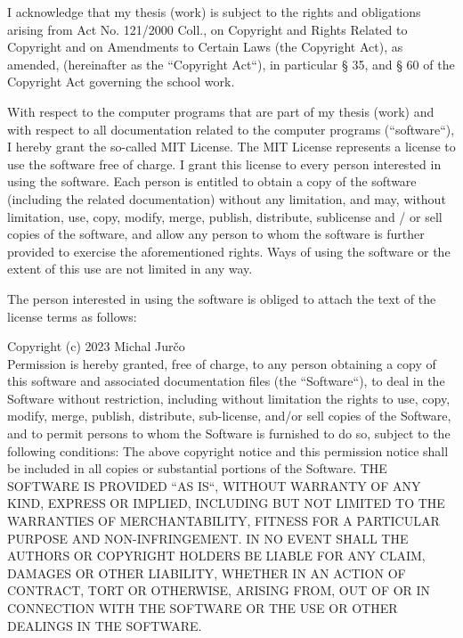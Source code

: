 \medskip\noindent
I acknowledge that my thesis (work) is subject to the rights and obligations
arising from Act No. 121/2000 Coll., on Copyright and Rights Related to
Copyright and on Amendments to Certain Laws (the Copyright Act), as
amended, (hereinafter as the “Copyright Act“), in particular § 35, and § 60 of
the Copyright Act governing the school work.

\medskip\noindent
With respect to the computer programs that are part of my thesis (work) and
with respect to all documentation related to the computer programs (“software“),
I hereby grant the so-called MIT License. The MIT License represents a license
to use the software free of charge. I grant this license to every person interested
in using the software. Each person is entitled to obtain a copy of the software
(including the related documentation) without any limitation, and may, without
limitation, use, copy, modify, merge, publish, distribute, sublicense and / or sell
copies of the software, and allow any person to whom the software is further
provided to exercise the aforementioned rights. Ways of using the software or
the extent of this use are not limited in any way.

\medskip\noindent
The person interested in using the software is obliged to attach the text of
the license terms as follows:

\medskip\noindent
Copyright (c) 2023 Michal Jurčo\\
Permission is hereby granted, free of charge, to any person obtaining a copy of
this software and associated documentation files (the “Software“), to deal in
the Software without restriction, including without limitation the rights to use,
copy, modify, merge, publish, distribute, sub-license, and/or sell copies of the
Software, and to permit persons to whom the Software is furnished to do so,
subject to the following conditions:
The above copyright notice and this permission notice shall be included in all
copies or substantial portions of the Software.
THE SOFTWARE IS PROVIDED “AS IS“, WITHOUT WARRANTY OF
ANY KIND, EXPRESS OR IMPLIED, INCLUDING BUT NOT LIMITED
TO THE WARRANTIES OF MERCHANTABILITY, FITNESS FOR A PARTICULAR PURPOSE AND NON-INFRINGEMENT. IN NO EVENT SHALL
THE AUTHORS OR COPYRIGHT HOLDERS BE LIABLE FOR ANY
CLAIM, DAMAGES OR OTHER LIABILITY, WHETHER IN AN ACTION
OF CONTRACT, TORT OR OTHERWISE, ARISING FROM, OUT OF OR
IN CONNECTION WITH THE SOFTWARE OR THE USE OR OTHER
DEALINGS IN THE SOFTWARE.\\ \\

